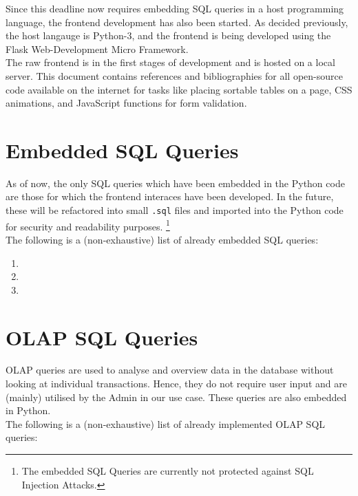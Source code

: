 \documentclass[12pt]{report}
\begin{document}
    Since this deadline now requires embedding SQL queries in a host programming language, the frontend development has also been started.
    As decided previously, the host langauge is Python-3, and the frontend is being developed using the Flask Web-Development Micro Framework. \\
    The raw frontend is in the first stages of development and is hosted on a local server.
    This document contains references and bibliographies for all open-source code available on the internet for tasks like placing sortable tables on a page,
    CSS animations, and JavaScript functions for form validation.

    \section*{\Huge Embedded SQL Queries}
    \vspace*{10pt}

    As of now, the only SQL queries which have been embedded in the Python code are those for which the frontend interaces have been developed.
    In the future, these will be refactored into small \texttt{.sql} files and imported into the Python code for security and readability purposes.
    \footnote{The embedded SQL Queries are currently not protected against SQL Injection Attacks.}
    \vspace*{10pt} \\
    The following is a (non-exhaustive) list of already embedded SQL queries:

    \begin{enumerate}
        \item 
        \item 
        \item 
    \end{enumerate}

    \section*{\Huge OLAP SQL Queries}
    \vspace*{10pt}

    OLAP queries are used to analyse and overview data in the database without looking at individual transactions.
    Hence, they do not require user input and are (mainly) utilised by the Admin in our use case.
    These queries are also embedded in Python.
    \vspace*{10pt} \\
    The following is a (non-exhaustive) list of already implemented OLAP SQL queries:
\end{document}
